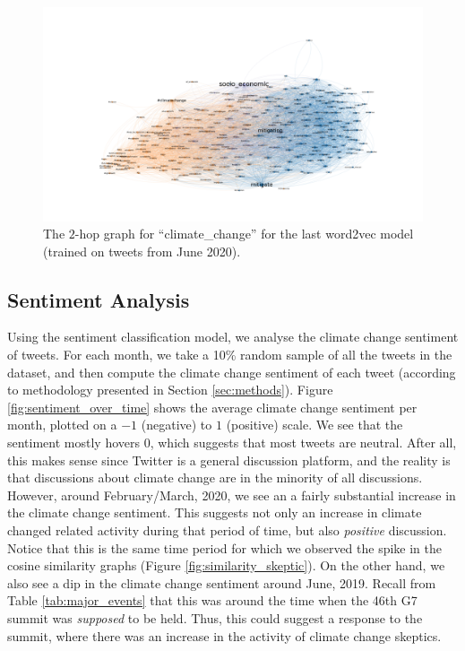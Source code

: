\documentclass{paper}
\begin{document}
\begin{figure}
    \centering
    \includegraphics[width=\textwidth]{2Hop_ClimateChange_2020_06.png}
    \caption{The $2$-hop graph for ``climate\_change'' for the last word2vec model (trained on tweets from June 2020).}
    \label{fig:2hop_climate_change_LAST}
\end{figure}

\subsection{Sentiment Analysis}
Using the sentiment classification model, we analyse the climate change sentiment of tweets. For each month, we take a 10\% random sample of all the tweets in the dataset, and then compute the climate change sentiment of each tweet (according to methodology presented in Section \ref{sec:methods}). Figure \ref{fig:sentiment_over_time} shows the average climate change sentiment per month, plotted on a $-1$ (negative) to $1$ (positive) scale. We see that the sentiment mostly hovers $0$, which suggests that most tweets are neutral. After all, this makes sense since Twitter is a general discussion platform, and the reality is that discussions about climate change are in the minority of all discussions. However, around February/March, 2020, we see an a fairly substantial increase in the climate change sentiment. This suggests not only an increase in climate changed related activity during that period of time, but also \textit{positive} discussion. Notice that this is the same time period for which we observed the spike in the cosine similarity graphs (Figure \ref{fig:similarity_skeptic}). On the other hand, we also see a dip in the climate change sentiment around June, 2019. Recall from Table \ref{tab:major_events} that this was around the time when the 46th G7 summit was \textit{supposed} to be held. Thus, this could suggest a response to the summit, where there was an increase in the activity of climate change skeptics.
\end{document}
